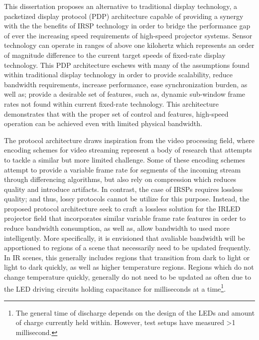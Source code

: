 This dissertation proposes an alternative to traditional display technology, a packetized display protocol (PDP) architecture capable of providing a synergy with the the benefits of IRSP technology in order to bridge the performance gap of ever the increasing speed requirements of high-speed projector systems. Sensor technology can operate in ranges of above one kilohertz which represents an order of magnitude difference to the current target speeds of fixed-rate display technology. This PDP architecture eschews with many of the assumptions found within traditional display technology in order to provide scalability, reduce bandwidth requirements, increase performance, ease synchronization burden, as well as; provide a desirable set of features, such as, dynamic sub-window frame rates not found within current fixed-rate technology. This architecture demonstrates that with the proper set of control and features, high-speed operation can be achieved even with limited physical bandwidth.

The protocol architecture draws inspiration from the video processing field, where encoding schemes for video streaming represent a body of research that attempts to tackle a similar but more limited challenge\cite{BakarEtAl2017}. Some of these encoding schemes attempt to provide a variable frame rate for segments of the incoming stream through differencing algorithms, but also rely on compression\cite{CastilloEtAl2012} which reduces quality and introduce artifacts. In contrast, the case of IRSPs requires lossless quality; and thus, lossy protocols cannot be utilize for this purpose. Instead, the proposed protocol architecture seek to craft a lossless solution for the IRLED projector field that incorporates similar variable frame rate features in order to reduce bandwidth consumption, as well as, allow bandwidth to used more intelligently. More specifically, it is envisioned that avaliable bandwidth will be apportioned to regions of a scene that necessarily need to be updated frequently. In IR scenes, this generally includes regions that transition from dark to light or light to dark quickly, as well as higher temperature regions. Regions which do not change temperature quickly, generally do not need to be updated as often due to the LED driving circuits holding capacitance for milliseconds at a time\footnote{The general time of discharge depends on the design of the LEDs and amount of charge currently held within. However, test setups have measured \textgreater1 millisecond.}.

